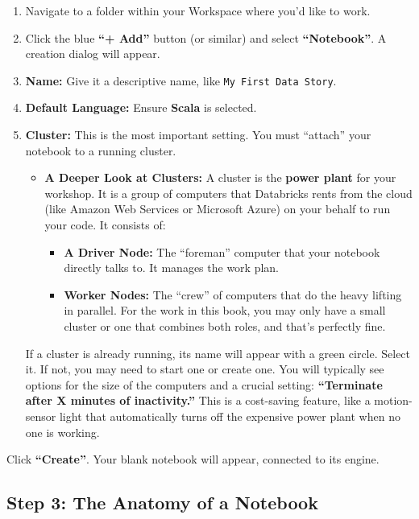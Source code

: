 \documentclass[
  letterpaper,
  DIV=11,
  numbers=noendperiod]{scrreprt}
\providecommand{\tightlist}{%
  \setlength{\itemsep}{0pt}\setlength{\parskip}{0pt}}
\begin{document}
\begin{enumerate}
\def\labelenumi{\arabic{enumi}.}
\item
  Navigate to a folder within your Workspace where you'd like to work.
\item
  Click the blue \textbf{``+ Add''} button (or similar) and select
  \textbf{``Notebook''}. A creation dialog will appear.
\item
  \textbf{Name:} Give it a descriptive name, like
  \texttt{My\ First\ Data\ Story}.
\item
  \textbf{Default Language:} Ensure \textbf{Scala} is selected.
\item
  \textbf{Cluster:} This is the most important setting. You must
  ``attach'' your notebook to a running cluster.

  \begin{itemize}
  \tightlist
  \item
    \textbf{A Deeper Look at Clusters:} A cluster is the \textbf{power
    plant} for your workshop. It is a group of computers that Databricks
    rents from the cloud (like Amazon Web Services or Microsoft Azure)
    on your behalf to run your code. It consists of:

    \begin{itemize}
    \tightlist
    \item
      \textbf{A Driver Node:} The ``foreman'' computer that your
      notebook directly talks to. It manages the work plan.
    \item
      \textbf{Worker Nodes:} The ``crew'' of computers that do the heavy
      lifting in parallel. For the work in this book, you may only have
      a small cluster or one that combines both roles, and that's
      perfectly fine.
    \end{itemize}
  \end{itemize}

  If a cluster is already running, its name will appear with a green
  circle. Select it. If not, you may need to start one or create one.
  You will typically see options for the size of the computers and a
  crucial setting: \textbf{``Terminate after X minutes of inactivity.''}
  This is a cost-saving feature, like a motion-sensor light that
  automatically turns off the expensive power plant when no one is
  working.
\end{enumerate}

Click \textbf{``Create''}. Your blank notebook will appear, connected to
its engine.

\subsection*{Step 3: The Anatomy of a
Notebook}\label{step-3-the-anatomy-of-a-notebook}
\end{document}
